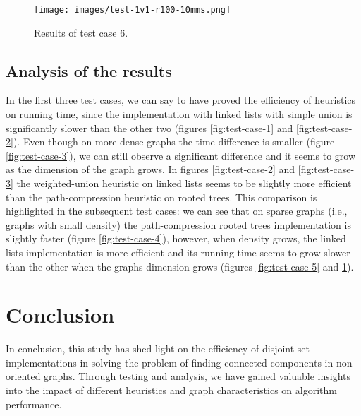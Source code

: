 \documentclass[11pt]{article}
\begin{document}
    \begin{table}[H]
        \centering
        \begin{figure}[H]
            \centering
            \texttt{[image: images/test-1v1-r100-10mms.png]}
            \caption{Results of test case 6.}
            \label{fig:test-case-6}
        \end{figure}
    \end{table}
    \subsection{Analysis of the results}
    In the first three test cases, we can say to have proved the efficiency of heuristics on running time, since the implementation with linked lists with simple union is significantly slower than the other two (figures \ref{fig:test-case-1} and \ref{fig:test-case-2}). Even though on more dense graphs the time difference is smaller (figure \ref{fig:test-case-3}), we can still observe a significant difference and it seems to grow as the dimension of the graph grows. In figures \ref{fig:test-case-2} and \ref{fig:test-case-3} the weighted-union heuristic on linked lists seems to be slightly more efficient than the path-compression heuristic on rooted trees. This comparison is highlighted in the subsequent test cases: we can see that on sparse graphs (i.e., graphs with small density) the path-compression rooted trees implementation is slightly faster (figure \ref{fig:test-case-4}), however, when density grows, the linked lists implementation is more efficient and its running time seems to grow slower than the other when the graphs dimension grows (figures \ref{fig:test-case-5} and \ref{fig:test-case-6}).
    \section{Conclusion}
    In conclusion, this study has shed light on the efficiency of disjoint-set implementations in solving the problem of finding connected components in non-oriented graphs. Through testing and analysis, we have gained valuable insights into the impact of different heuristics and graph characteristics on algorithm performance.
\end{document}
